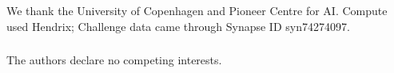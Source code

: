 \begin{credits}
\subsubsection{\ackname}
We thank the University of Copenhagen and Pioneer Centre for AI. Compute used
Hendrix; Challenge data came through Synapse ID syn74274097.

\subsubsection{\discintname}
The authors declare no competing interests.
\end{credits}
